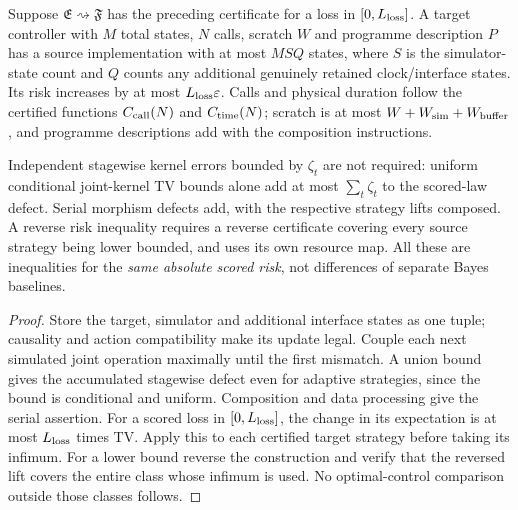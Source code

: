 \begin{proposition}\label{prop:morphism}
Suppose $\mathfrak E\rightsquigarrow\mathfrak F$ has the preceding certificate for a loss in $[0,L_{\rm loss}]$. A target controller with $M$ total states, $N$ calls, scratch $W$ and programme description $P$ has a source implementation with at most $MSQ$ states, where $S$ is the simulator-state count and $Q$ counts any additional genuinely retained clock/interface states. Its risk increases by at most $L_{\rm loss}\varepsilon$. Calls and physical duration follow the certified functions $C_{\rm call}(N)$ and $C_{\rm time}(N)$; scratch is at most $W+W_{\rm sim}+W_{\rm buffer}$, and programme descriptions add with the composition instructions.

Independent stagewise kernel errors bounded by $\zeta_t$ are not required: uniform conditional joint-kernel TV bounds alone add at most $\sum_t\zeta_t$ to the scored-law defect. Serial morphism defects add, with the respective strategy lifts composed. A reverse risk inequality requires a reverse certificate covering every source strategy being lower bounded, and uses its own resource map. All these are inequalities for the \emph{same absolute scored risk}, not differences of separate Bayes baselines.
\end{proposition}
\begin{proof}
Store the target, simulator and additional interface states as one tuple; causality and action compatibility make its update legal. Couple each next simulated joint operation maximally until the first mismatch. A union bound gives the accumulated stagewise defect even for adaptive strategies, since the bound is conditional and uniform. Composition and data processing give the serial assertion. For a scored loss in $[0,L_{\rm loss}]$, the change in its expectation is at most $L_{\rm loss}$ times TV. Apply this to each certified target strategy before taking its infimum. For a lower bound reverse the construction and verify that the reversed lift covers the entire class whose infimum is used. No optimal-control comparison outside those classes follows.
\end{proof}

